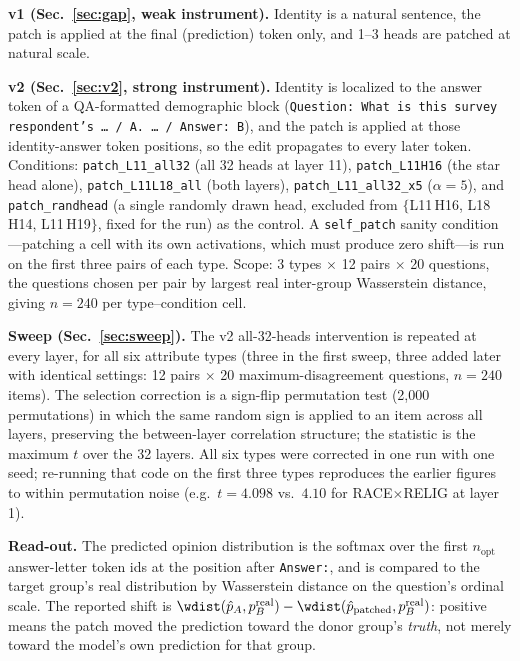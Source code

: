 \textbf{v1 (Sec.~\ref{sec:gap}, weak instrument).} Identity is a natural
sentence, the patch is applied at the final (prediction) token only, and
1--3 heads are patched at natural scale.

\textbf{v2 (Sec.~\ref{sec:v2}, strong instrument).} Identity is localized
to the answer token of a QA-formatted demographic block
(\texttt{Question: What is this survey respondent's \dots{} / A. \dots{} /
Answer: B}), and the patch is applied at those identity-answer token
positions, so the edit propagates to every later token. Conditions:
\texttt{patch\_L11\_all32} (all 32 heads at layer 11),
\texttt{patch\_L11H16} (the star head alone),
\texttt{patch\_L11L18\_all} (both layers), \texttt{patch\_L11\_all32\_x5}
($\alpha=5$), and \texttt{patch\_randhead} (a single randomly drawn head,
excluded from $\{$L11\,H16, L18\,H14, L11\,H19$\}$, fixed for the run) as
the control. A \texttt{self\_patch} sanity condition---patching a cell
with its own activations, which must produce zero shift---is run on the
first three pairs of each type. Scope: 3 types $\times$ 12 pairs $\times$
20 questions, the questions chosen per pair by largest real inter-group
Wasserstein distance, giving $n=240$ per type--condition cell.

\textbf{Sweep (Sec.~\ref{sec:sweep}).} The v2 all-32-heads intervention is
repeated at every layer, for all six attribute types (three in the first
sweep, three added later with identical settings: 12 pairs $\times$ 20
maximum-disagreement questions, $n=240$ items). The selection correction
is a sign-flip permutation test (2{,}000 permutations) in which the same
random sign is applied to an item across all layers, preserving the
between-layer correlation structure; the statistic is the maximum $t$ over
the 32 layers. All six types were corrected in one run with one seed;
re-running that code on the first three types reproduces the earlier
figures to within permutation noise (e.g.\ $t=4.098$ vs.\ $4.10$ for
RACE$\times$RELIG at layer 1).

\textbf{Read-out.} The predicted opinion distribution is the softmax over
the first $n_{\text{opt}}$ answer-letter token ids at the position after
\texttt{Answer:}, and is compared to the target group's real distribution
by Wasserstein distance on the question's ordinal scale. The reported
shift is
$\wdist(\hat{p}_A, p^{\mathrm{real}}_B) - \wdist(\hat{p}_{\text{patched}},
p^{\mathrm{real}}_B)$: positive means the patch moved the prediction
toward the donor group's \emph{truth}, not merely toward the model's own
prediction for that group.

